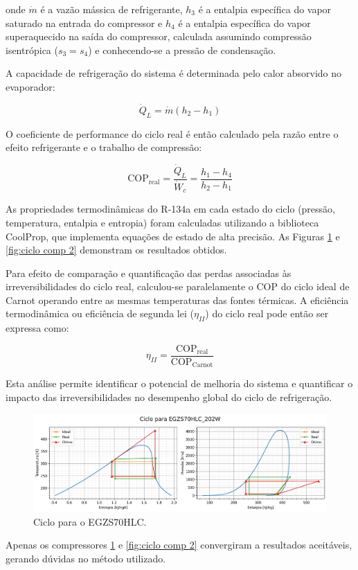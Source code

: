 \noindent onde $\dot{m}$ é a vazão mássica de refrigerante, $h_3$ é a entalpia específica do vapor saturado na entrada do compressor e $h_4$ é a entalpia específica do vapor superaquecido na saída do compressor, calculada assumindo compressão isentrópica ($s_3 = s_4$) e conhecendo-se a pressão de condensação.

A capacidade de refrigeração do sistema é determinada pelo calor absorvido no evaporador:

\begin{equation}
    \dot{Q}_L = \dot{m}(h_2 - h_1)
    \label{capacidade evaporador}
\end{equation}

O coeficiente de performance do ciclo real é então calculado pela razão entre o efeito refrigerante e o trabalho de compressão:

\begin{equation}
    \text{COP}_{\text{real}} = \frac{\dot{Q}_L}{\dot{W}_c} = \frac{h_1 - h_4}{h_2 - h_1}
    \label{cop real}
\end{equation}

As propriedades termodinâmicas do R-134a em cada estado do ciclo (pressão, temperatura, entalpia e entropia) foram calculadas utilizando a biblioteca CoolProp, que implementa equações de estado de alta precisão. As Figuras \ref{fig:ciclo comp 1} e \ref{fig:ciclo comp 2} demonstram os resultados obtidos.

Para efeito de comparação e quantificação das perdas associadas às irreversibilidades do ciclo real, calculou-se paralelamente o COP do ciclo ideal de Carnot operando entre as mesmas temperaturas das fontes térmicas. A eficiência termodinâmica ou eficiência de segunda lei ($\eta_{II}$) do ciclo real pode então ser expressa como:

\begin{equation}
    \eta_{II} = \frac{\text{COP}_{\text{real}}}{\text{COP}_{\text{Carnot}}}
    \label{eficiencia segunda lei}
\end{equation}


Esta análise permite identificar o potencial de melhoria do sistema e quantificar o impacto das irreversibilidades no desempenho global do ciclo de refrigeração.

\begin{figure}[ht]
    \centering
    \includegraphics[width=\linewidth]{Imagens/Desenvolvimento/ciclo_EGZS70HLC_202W.png}
    \caption{Ciclo para o EGZS70HLC.}
    \label{fig:ciclo comp 1}
\end{figure}
Apenas os compressores \ref{fig:ciclo comp 1} e \ref{fig:ciclo comp 2} convergiram a resultados aceitáveis, gerando dúvidas no método utilizado.


